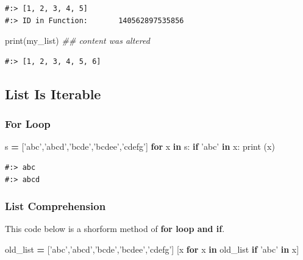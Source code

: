 \documentclass[
]{book}
\newenvironment{Shaded}{\begin{snugshade}}{\end{snugshade}}
\newcommand{\BuiltInTok}[1]{#1}
\newcommand{\CommentTok}[1]{\textcolor[rgb]{0.37,0.37,0.37}{\textit{#1}}}
\newcommand{\ControlFlowTok}[1]{\textcolor[rgb]{0.27,0.27,0.27}{\textbf{#1}}}
\newcommand{\KeywordTok}[1]{\textcolor[rgb]{0.27,0.27,0.27}{\textbf{#1}}}
\newcommand{\NormalTok}[1]{#1}
\newcommand{\OperatorTok}[1]{\textcolor[rgb]{0.43,0.43,0.43}{\textbf{#1}}}
\newcommand{\StringTok}[1]{\textcolor[rgb]{0.5,0.5,0.5}{#1}}
\begin{document}
\begin{verbatim}
#:> [1, 2, 3, 4, 5]
#:> ID in Function:       140562897535856
\end{verbatim}

\begin{Shaded}
\begin{Highlighting}[]
\BuiltInTok{print}\NormalTok{(my_list) }\CommentTok{## content was altered}
\end{Highlighting}
\end{Shaded}

\begin{verbatim}
#:> [1, 2, 3, 4, 5, 6]
\end{verbatim}

\hypertarget{list-is-iterable}{%
\subsection{List Is Iterable}\label{list-is-iterable}}

\hypertarget{for-loop}{%
\subsubsection{For Loop}\label{for-loop}}

\begin{Shaded}
\begin{Highlighting}[]
\NormalTok{s }\OperatorTok{=}\NormalTok{ [}\StringTok{'abc'}\NormalTok{,}\StringTok{'abcd'}\NormalTok{,}\StringTok{'bcde'}\NormalTok{,}\StringTok{'bcdee'}\NormalTok{,}\StringTok{'cdefg'}\NormalTok{]}
\ControlFlowTok{for}\NormalTok{ x }\KeywordTok{in}\NormalTok{ s:}
    \ControlFlowTok{if} \StringTok{'abc'} \KeywordTok{in}\NormalTok{ x:}
        \BuiltInTok{print}\NormalTok{ (x)}
\end{Highlighting}
\end{Shaded}

\begin{verbatim}
#:> abc
#:> abcd
\end{verbatim}

\hypertarget{list-comprehension}{%
\subsubsection{List Comprehension}\label{list-comprehension}}

This code below is a shorform method of \textbf{for loop and if}.

\begin{Shaded}
\begin{Highlighting}[]
\NormalTok{old_list }\OperatorTok{=}\NormalTok{ [}\StringTok{'abc'}\NormalTok{,}\StringTok{'abcd'}\NormalTok{,}\StringTok{'bcde'}\NormalTok{,}\StringTok{'bcdee'}\NormalTok{,}\StringTok{'cdefg'}\NormalTok{]}
\NormalTok{[x }\ControlFlowTok{for}\NormalTok{ x }\KeywordTok{in}\NormalTok{ old_list }\ControlFlowTok{if} \StringTok{'abc'} \KeywordTok{in}\NormalTok{ x]}
\end{Highlighting}
\end{Shaded}
\end{document}
